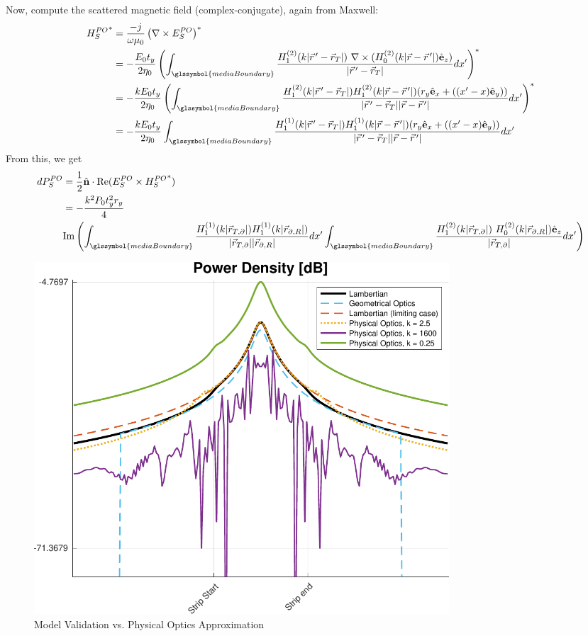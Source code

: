 \documentclass{article}
\begin{document}
Now, compute the scattered magnetic field (complex-conjugate), again from Maxwell:
\begin{align}
   {H_S^{PO}}^* &= \frac{-j}{\omega \mu_0} \left(\nabla \times E_S^{PO} \right)^* \nonumber \\
   &= - \frac{E_0 t_y}{2 \eta_0} \left( \int_{\glssymbol{mediaBoundary}}
      \frac{H_1^{(2)}(k | \vec{r}^{\,\prime} - \vec{r}_T |) \ \nabla \times (
      H_0^{(2)}(k |\vec{r} - \vec{r}^{\,\prime}|)\hat{\mathbf{e}}_z)
      }{|\vec{r}^{\,\prime} - \vec{r}_T|} dx' \right)^* \nonumber \\
   &= - \frac{k E_0 t_y}{2 \eta_0} \left( \int_{\glssymbol{mediaBoundary}} \frac{H_1^{(2)}(k |
      \vec{r}^{\,\prime} - \vec{r}_T |)H_1^{(2)}(k |\vec{r} - \vec{r}^{\,\prime}|)
      (r_y \hat{\mathbf{e}}_x + ( (x' - x) \hat{\mathbf{e}}_y))}{|\vec{r}^{\,\prime}
      - \vec{r}_T| |\vec{r} - \vec{r}^{\,\prime}|} dx' \right)^* \nonumber \\
   &= - \frac{k E_0 t_y}{2 \eta_0} \int_{\glssymbol{mediaBoundary}} \frac{H_1^{(1)}(k |
      \vec{r}^{\,\prime} - \vec{r}_T |)H_1^{(1)}(k |\vec{r} - \vec{r}^{\,\prime}|)
      (r_y \hat{\mathbf{e}}_x + ( (x' - x) \hat{\mathbf{e}}_y))}{|\vec{r}^{\,\prime}
      - \vec{r}_T| |\vec{r} - \vec{r}^{\,\prime}|} dx' \nonumber
\end{align}
From this, we get 
{ \scriptsize
\begin{align}
   dP_S^{PO} &= \frac{1}{2} \hat{\mathbf{n}} \cdot \text{Re} ( E_S^{PO} \times
   {H_S^{PO}}^*) \nonumber \\
   &= - \frac{k^2 P_0 t_y^2 r_y}{4} \nonumber \\ 
   & \text{Im} \left( \int_{\glssymbol{mediaBoundary}}
      \frac{H_1^{(1)}(k | \vec{r}_{T,\partial} |)H_1^{(1)}(k |\vec{r}_{\partial,R}|)}{|\vec{r}_{T,\partial}| |\vec{r}_{\partial,R}|} dx' \int_{\glssymbol{mediaBoundary}} \frac{H_1^{(2)}(k |
      \vec{r}_{T,\partial} |) \ H_0^{(2)}(k |\vec{r}_{\partial,R}|)\hat{\mathbf{e}}_z }{|\vec{r}_{T,\partial}|} dx'
      \right)
   \label{eq:PowerDensityPO}
\end{align}
}
\begin{figure}[h]
   \begin{center}
      \includegraphics[width=0.75\textwidth]{../figures/PowerDensityValidation1.pdf}
   \end{center}
   \caption{Model Validation vs. Physical Optics Approximation}\label{fig:powerDensityValidation1}
\end{figure}
\end{document}
